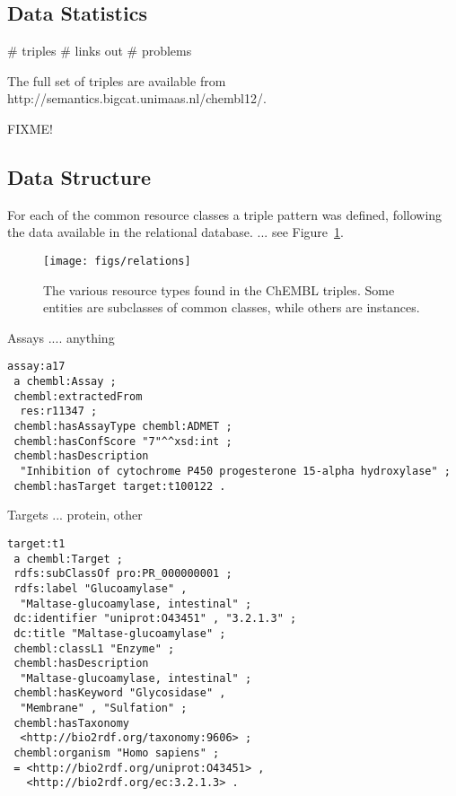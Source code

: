 \documentclass[sw]{iosart2c}
\begin{document}
\subsection{Data Statistics}

\# triples
\# links out
\# problems

The full set of triples are available from http://semantics.bigcat.unimaas.nl/chembl12/.

FIXME!

\subsection{Data Structure}

For each of the common resource classes a triple pattern was defined, following the
data available in the relational database. ... see Figure~\ref{f1}.

\begin{figure}[t]
\texttt{[image: figs/relations]}
\caption{The various resource types found in the ChEMBL triples. Some entities are subclasses
of common classes, while others are instances.}\label{f1}
\end{figure}

Assays .... anything

\begin{small}
\begin{verbatim}
assay:a17
 a chembl:Assay ;
 chembl:extractedFrom
  res:r11347 ;
 chembl:hasAssayType chembl:ADMET ;
 chembl:hasConfScore "7"^^xsd:int ;
 chembl:hasDescription
  "Inhibition of cytochrome P450 progesterone 15-alpha hydroxylase" ;
 chembl:hasTarget target:t100122 .
\end{verbatim}
\end{small}

Targets ... protein, other

\begin{small}
\begin{verbatim}
target:t1
 a chembl:Target ;
 rdfs:subClassOf pro:PR_000000001 ;
 rdfs:label "Glucoamylase" , 
  "Maltase-glucoamylase, intestinal" ;
 dc:identifier "uniprot:O43451" , "3.2.1.3" ;
 dc:title "Maltase-glucoamylase" ;
 chembl:classL1 "Enzyme" ;
 chembl:hasDescription
  "Maltase-glucoamylase, intestinal" ;
 chembl:hasKeyword "Glycosidase" , 
  "Membrane" , "Sulfation" ;
 chembl:hasTaxonomy
  <http://bio2rdf.org/taxonomy:9606> ;
 chembl:organism "Homo sapiens" ;
 = <http://bio2rdf.org/uniprot:O43451> , 
   <http://bio2rdf.org/ec:3.2.1.3> .
\end{verbatim}
\end{small}
\end{document}

